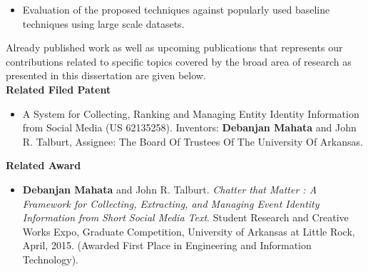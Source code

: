 \begin{itemize}
\item Evaluation of the proposed techniques against popularly used baseline techniques using large scale datasets.

\end{itemize}

Already published work as well as upcoming publications that represents our contributions related to specific topics covered by the broad area of research as presented in this dissertation are given below. \\ 

\textbf{\LARGE Related Filed Patent}
\begin{itemize}
\item A System for Collecting, Ranking and Managing Entity Identity Information from Social Media (US 62135258). Inventors: \textbf{Debanjan Mahata} and John R. Talburt, Assignee: The Board Of Trustees Of The University Of Arkansas.
\end{itemize}

\textbf{\LARGE Related Award}
\begin{itemize}
\item \textbf{Debanjan Mahata} and John R. Talburt. \textit{Chatter that Matter : A Framework for Collecting, Extracting, and Managing Event Identity Information from Short Social Media Text}. Student Research and Creative Works Expo, Graduate Competition, University of Arkansas at Little Rock, April, 2015. (Awarded First Place in Engineering and Information Technology).  
\end{itemize}

